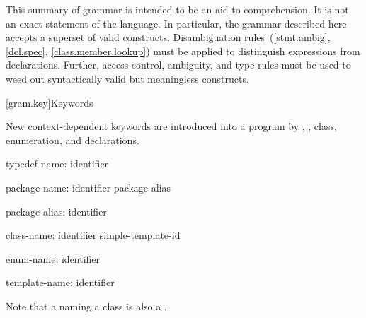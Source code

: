 
\pnum
{}%
%
This summary of \Java{} grammar is intended to be an aid to comprehension.
It is not an exact statement of the language.
In particular, the grammar described here accepts
a superset of valid \Java{} constructs.
Disambiguation rules~(\ref{stmt.ambig}, \ref{dcl.spec}, \ref{class.member.lookup})
must be applied to distinguish expressions from declarations.
Further, access control, ambiguity, and type rules must be used
to weed out syntactically valid but meaningless constructs.

[gram.key]{Keywords}

\pnum
{}%
New context-dependent keywords are introduced into a program by
,
,
class, enumeration, and
declarations.

\begin{ncbnf}
typedef-name:\br
	identifier
\end{ncbnf}

\begin{ncbnf}
package-name:\br
	identifier\br
	package-alias

package-alias:\br
	identifier
\end{ncbnf}

\begin{ncbnf}
class-name:\br
	identifier\br
	simple-template-id
\end{ncbnf}

\begin{ncbnf}
enum-name:\br
	identifier
\end{ncbnf}

\begin{ncbnf}
template-name:\br
	identifier
\end{ncbnf}

Note that a
naming a class is also a
.

\FlushAndPrintGrammar
